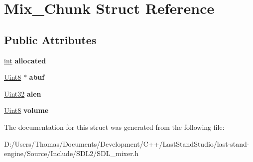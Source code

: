\hypertarget{structMix__Chunk}{}\section{Mix\+\_\+\+Chunk Struct Reference}
\label{structMix__Chunk}
\subsection*{Public Attributes}
\begin{DoxyCompactItemize}
\item 
\hypertarget{structMix__Chunk_a7b985b90b5f97fffe34834116a281615}{}\hyperlink{SDL__thread_8h_a6a64f9be4433e4de6e2f2f548cf3c08e}{int} {\bfseries allocated}\label{structMix__Chunk_a7b985b90b5f97fffe34834116a281615}

\item 
\hypertarget{structMix__Chunk_a30b3b1a72677d076a1caa72422bb3774}{}\hyperlink{SDL__stdinc_8h_a2944638813a090aa23e62f4da842c3e2}{Uint8} $\ast$ {\bfseries abuf}\label{structMix__Chunk_a30b3b1a72677d076a1caa72422bb3774}

\item 
\hypertarget{structMix__Chunk_a958507964471fc4b9fa0d215f1852d05}{}\hyperlink{SDL__stdinc_8h_add440eff171ea5f55cb00c4a9ab8672d}{Uint32} {\bfseries alen}\label{structMix__Chunk_a958507964471fc4b9fa0d215f1852d05}

\item 
\hypertarget{structMix__Chunk_afc566fd5da7f0ed1f3577f5bc0eac319}{}\hyperlink{SDL__stdinc_8h_a2944638813a090aa23e62f4da842c3e2}{Uint8} {\bfseries volume}\label{structMix__Chunk_afc566fd5da7f0ed1f3577f5bc0eac319}

\end{DoxyCompactItemize}


The documentation for this struct was generated from the following file\+:\begin{DoxyCompactItemize}
\item 
D\+:/\+Users/\+Thomas/\+Documents/\+Development/\+C++/\+Last\+Stand\+Studio/last-\/stand-\/engine/\+Source/\+Include/\+S\+D\+L2/S\+D\+L\+\_\+mixer.\+h\end{DoxyCompactItemize}

